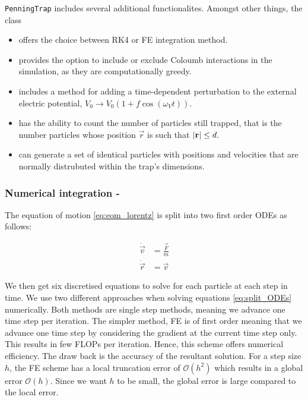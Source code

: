 
\texttt{PenningTrap} includes several additional functionalites. Amongst other things, the class

\begin{itemize}
    \item offers the choice between RK4 or FE integration method.
    \item provides the option to include or exclude Coloumb interactions in the simulation, as they are computationally greedy.
    \item includes a method for adding a time-dependent perturbation to the external electric potential, $V_0\rightarrow V_0 (1+ f\cos{(\omega_V t)})$.
    \item has the ability to count the number of particles still trapped, that is the number particles whose position $\vec{r}$ is such that $\abs{\mathbf{r}} \leq d$.
    \item can generate a set of identical particles with positions and velocities that are normally distrubuted within the trap's dimensions.
\end{itemize}

\subsubsection*{Numerical integration - }
The equation of motion \eqref{eq:eom_lorentz} is split into two first order ODEs as follows:

\begin{equation}\label{eq:split_ODEs}
    \begin{split}
        \dot{\vec{v}} &= \frac{\vec{F}}{m} \\
        \dot{\vec{r}} &= \vec{v}
    \end{split}
\end{equation}

We then get six discretised equations to solve for each particle at each step in time. We use two different approaches when solving equations \ref{eq:split_ODEs} numerically. Both methods are single step methods, meaning we advance one time step per iteration. The simpler method, FE \citep{Atkinson1989} is of first order meaning that we advance one time step by considering the gradient at the current time step only. This results in few FLOPs per iteration. Hence, this scheme offers numerical efficiency. The draw back is the accuracy of the resultant solution. For a step size $h$, the FE scheme has a local truncation error of $\mathcal{O}(h^2)$ which results in a global error $\mathcal{O}(h)$. Since we want $h$ to be small, the global error is large compared to the local error.  

